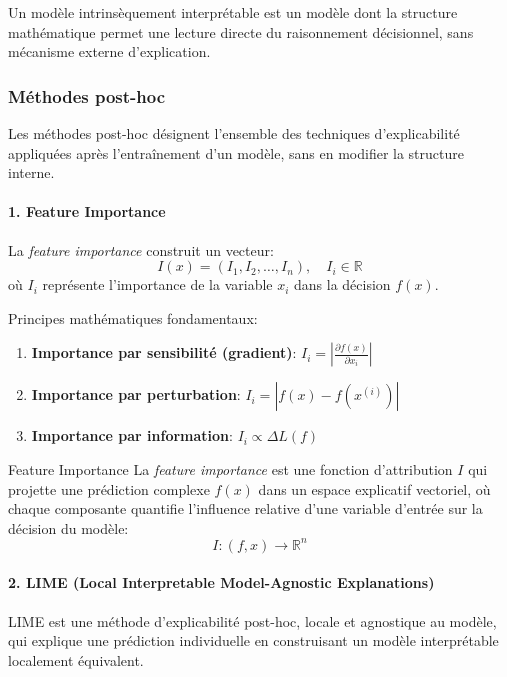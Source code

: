 \begin{pointcle}
Un modèle intrinsèquement interprétable est un modèle dont la structure mathématique permet une lecture directe du raisonnement décisionnel, sans mécanisme externe d’explication.
\end{pointcle}

\subsubsection{Méthodes post-hoc}

Les méthodes post-hoc désignent l’ensemble des techniques d’explicabilité appliquées après l’entraînement d’un modèle, sans en modifier la structure interne.

\paragraph{1. Feature Importance}

La \textit{feature importance} construit un vecteur:
\[
I(x) = (I_1, I_2, \dots, I_n), \quad I_i \in \mathbb{R}
\]
où $I_i$ représente l’importance de la variable $x_i$ dans la décision $f(x)$.

Principes mathématiques fondamentaux:
\begin{enumerate}
    \item \textbf{Importance par sensibilité (gradient)}: $I_i = \left| \frac{\partial f(x)}{\partial x_i} \right|$
    \item \textbf{Importance par perturbation}: $I_i = | f(x) - f(x^{(i)}) |$
    \item \textbf{Importance par information}: $I_i \propto \Delta L(f)$
\end{enumerate}

\begin{definition}{Feature Importance}
La \textit{feature importance} est une fonction d’attribution $I$ qui projette une prédiction complexe $f(x)$ dans un espace explicatif vectoriel, où chaque composante quantifie l’influence relative d’une variable d’entrée sur la décision du modèle:
\[
I : (f, x) \rightarrow \mathbb{R}^n
\]
\end{definition}

\paragraph{2. LIME (Local Interpretable Model-Agnostic Explanations)}

LIME est une méthode d’explicabilité post-hoc, locale et agnostique au modèle, qui explique une prédiction individuelle en construisant un modèle interprétable localement équivalent.

